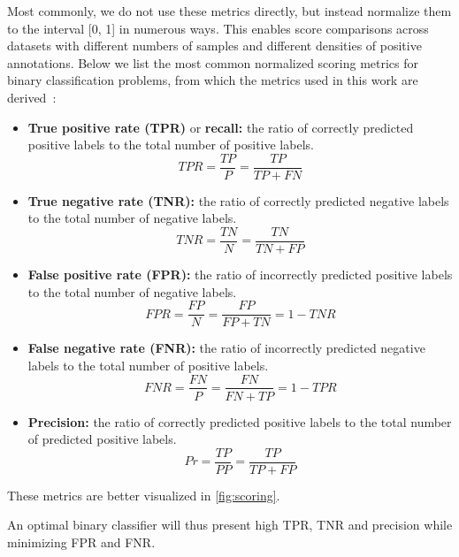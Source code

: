 Most commonly, we do not use these metrics directly, but instead normalize them to the interval [0, 1] in numerous ways. This enables score comparisons across datasets with different numbers of samples and different densities of positive annotations. Below we list the most common normalized scoring metrics for binary classification problems, from which the metrics used in this work are derived~\cite{powers2020evaluation}:
%
\begin{itemize}
    \item \textbf{True positive rate (TPR)} or \textbf{recall:} the ratio of correctly predicted positive labels to the total number of positive labels.
    \begin{equation}
        TPR = \frac{TP}{P} = \frac{TP}{TP + FN}
        \label{eq:tpr}
    \end{equation}
    \item \textbf{True negative rate (TNR):} the ratio of correctly predicted negative labels to the total number of negative labels.
    \begin{equation}
        TNR = \frac{TN}{N} = \frac{TN}{TN + FP}
        \label{eq:tnr}
    \end{equation}
    \item \textbf{False positive rate (FPR):} the ratio of incorrectly predicted positive labels to the total number of negative labels.
    \begin{equation}
        FPR = \frac{FP}{N} = \frac{FP}{FP + TN} = 1-TNR 
        \label{eq:fpr}
    \end{equation}
    \item \textbf{False negative rate (FNR):} the ratio of incorrectly predicted negative labels to the total number of positive labels.
    \begin{equation}
        FNR = \frac{FN}{P} = \frac{FN}{FN + TP} = 1-TPR
        \label{eq:fnr}
    \end{equation}
    \item \textbf{Precision:} the ratio of correctly predicted positive labels to the total number of predicted positive labels.
    \begin{equation}
        Pr = \frac{TP}{PP} = \frac{TP}{TP + FP}
        \label{eq:precision}
    \end{equation}
\end{itemize}
%
These metrics are better visualized in \autoref{fig:scoring}.

An optimal binary classifier will thus present high TPR, TNR and precision while minimizing FPR and FNR.

